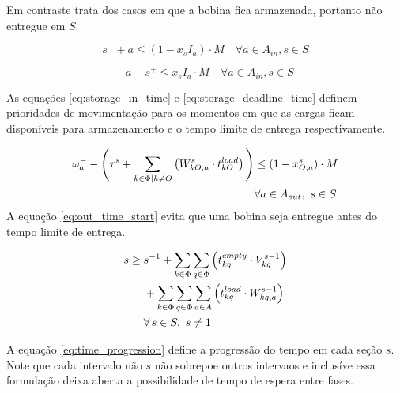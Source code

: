 \documentclass[journal]{IEEEtran}
\begin{document}
        Em contraste trata dos casos em que a bobina fica armazenada, portanto não
        entregue em $S$.
        
        

        \begin{equation}
        s^- + a \leq (1 - x_s I_a) \cdot M \quad \forall a \in A_{in}, s \in S 
            \label{eq:storage_in_time}
        \end{equation}
        
        \begin{equation}
            -a - s^+ \leq x_s I_a \cdot M \quad \forall a \in A_{in}, s \in S 
            \label{eq:storage_deadline_time}
        \end{equation}
        
        As equações \ref{eq:storage_in_time} e \ref{eq:storage_deadline_time} definem
        prioridades de movimentação para os momentos em que as cargas ficam disponíveis
        para armazenamento e o tempo limite de entrega respectivamente.

        \begin{align}
            \omega_a^- - \Bigg( \tau^s + 
            \sum_{k \in \Phi \mid k \neq O} \left( W^s_{kO,a} \cdot t^{load}_{kO} \right) 
            \Bigg) 
            &\leq (1 - x^s_{O,a}) \cdot M \notag \\
            &\forall a \in A_{out},\ s \in S 
            \label{eq:out_time_start}
        \end{align}
        A equação \ref{eq:out_time_start} evita que uma bobina seja entregue antes
        do tempo limite de entrega.

        \begin{align}
            s \geq\; & s^{-1} 
            + \sum_{k \in \Phi} \sum_{q \in \Phi} \left( t^{empty}_{kq} \cdot V^{s-1}_{kq} \right) \notag \\
            & + \sum_{k \in \Phi} \sum_{q \in \Phi} \sum_{a \in A} \left( t^{load}_{kq} \cdot W^{s-1}_{kq,a} \right) \notag \\
            & \forall\, s \in S,\ s \neq 1 \label{eq:time_progression}
        \end{align}

        A equação \ref{eq:time_progression} define a progressão do tempo em cada
         seção $s$.
        Note que cada intervalo não $s$ não sobrepoe outros intervaos e inclusíve
        essa formulação deixa aberta a possibilidade de tempo de espera entre fases.
        
\end{document}
